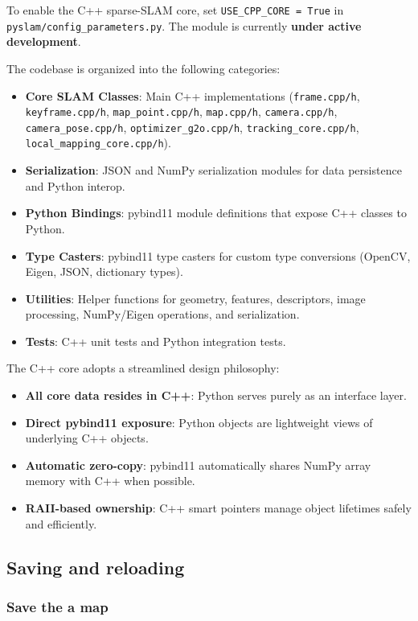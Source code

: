 \documentclass{article}
\begin{document}
To enable the C++ sparse-SLAM core, set \texttt{USE\_CPP\_CORE = True} in \texttt{pyslam/config\_parameters.py}. The module is currently \textbf{under active development}.

The codebase is organized into the following categories:
\begin{itemize}
\item \textbf{Core SLAM Classes}: Main C++ implementations (\texttt{frame.cpp/h}, \texttt{keyframe.cpp/h}, \texttt{map\_point.cpp/h}, \texttt{map.cpp/h}, \texttt{camera.cpp/h}, \texttt{camera\_pose.cpp/h}, \texttt{optimizer\_g2o.cpp/h}, \texttt{tracking\_core.cpp/h}, \texttt{local\_mapping\_core.cpp/h}).
\item \textbf{Serialization}: JSON and NumPy serialization modules for data persistence and Python interop.
\item \textbf{Python Bindings}: pybind11 module definitions that expose C++ classes to Python.
\item \textbf{Type Casters}: pybind11 type casters for custom type conversions (OpenCV, Eigen, JSON, dictionary types).
\item \textbf{Utilities}: Helper functions for geometry, features, descriptors, image processing, NumPy/Eigen operations, and serialization.
\item \textbf{Tests}: C++ unit tests and Python integration tests.
\end{itemize}

The C++ core adopts a streamlined design philosophy:
\begin{itemize}
\item \textbf{All core data resides in C++}: Python serves purely as an interface layer.
\item \textbf{Direct pybind11 exposure}: Python objects are lightweight views of underlying C++ objects.
\item \textbf{Automatic zero-copy}: pybind11 automatically shares NumPy array memory with C++ when possible.
\item \textbf{RAII-based ownership}: C++ smart pointers manage object lifetimes safely and efficiently.
\end{itemize}

\hypertarget{saving-and-reloading}{%
\subsection{Saving and reloading}\label{saving-and-reloading}}

\hypertarget{save-the-a-map}{%
\subsubsection{Save the a map}\label{save-the-a-map}}
\end{document}
